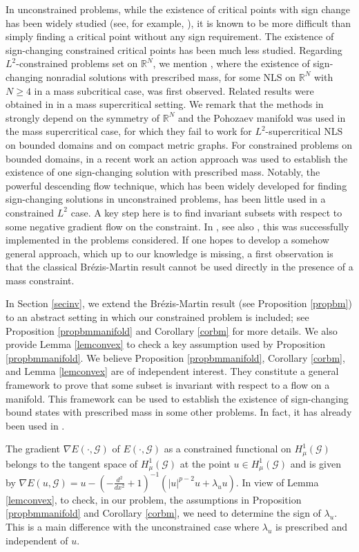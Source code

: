 \documentclass[10pt,a4paper]{article}
\theoremstyle{definition} \theoremstyle{remark}
\numberwithin{equation}{section}
\newcommand{\G}{\mathcal{G}}
\newcommand{\R}{\mathbb{R}}
\newcommand{\la}{\lambda}
\begin{document}
In unconstrained problems, while the existence of critical points with sign change has been widely studied (see, for example, \cite{BLW, LS, LWW, RTZ, SchZ1, SchZ, ZZ, Zou}), it is known to be more difficult than simply finding a critical point without any sign requirement. The existence of sign-changing constrained critical points has been much less studied. 
Regarding $L^2$-constrained problems set on $\R^N$, we mention \cite{JL1}, where the existence of sign-changing nonradial solutions with prescribed mass, for some NLS on $\R^N$ with $N \geq 4$ in a mass subcritical case, was first observed. Related results were obtained in \cite{JL2} in a mass supercritical setting.
We remark that the methods in \cite{JL1,JL2} strongly depend on the symmetry of $\R^N$ and the Pohozaev manifold was used in the mass supercritical case, for which they fail to work for $L^2$-supercritical NLS on bounded domains and on compact metric graphs. For constrained problems on bounded domains, in a recent work \cite{DeDoGaSe2} an action approach was used to establish the existence of one sign-changing solution with prescribed mass. 
Notably, the powerful descending flow technique, which has been widely developed for finding sign-changing solutions in unconstrained problems, has been little used in a constrained $L^2$ case. A key step here is to find invariant subsets with respect to some negative gradient flow on the constraint. In \cite{TaTe}, see also \cite{FeZhZhZh}, this was successfully implemented in the problems considered. If one hopes to develop a somehow general approach, which up to our knowledge is missing, a first observation is that the classical Br\'ezis-Martin result cannot be used directly in the presence of a mass constraint.

In Section \ref{secinv}, we extend the Br\'ezis-Martin result (see Proposition \ref{propbm}) to an abstract setting in which our constrained problem is included; see Proposition \ref{propbmmanifold} and Corollary \ref{corbm} for more details.
 We also provide Lemma \ref{lemconvex} to check a key assumption used by Proposition \ref{propbmmanifold}. We believe Proposition \ref{propbmmanifold}, Corollary \ref{corbm}, and Lemma \ref{lemconvex} are of independent interest. They constitute a general framework to prove that some subset is invariant with respect to a flow on a manifold. This framework can be used to establish the existence of sign-changing bound states with prescribed mass in some other problems. 
In fact, it has already been used in \cite{SZ}.

The gradient $\nabla E(\cdot, \G)$ of $E(\cdot,\G)$ as a constrained functional on $H^1_\mu(\G)$ belongs to the tangent space of $H^1_\mu(\G)$ at the point $u \in H^1_\mu(\G)$ and is given by
$\nabla E(u,\G) = u - (-\frac{d^2}{dx^2} +1)^{-1}(|u|^{p-2}u + \la_uu).$
In view of Lemma \ref{lemconvex}, to check, in our problem, the assumptions in Proposition \ref{propbmmanifold} and Corollary \ref{corbm}, we need to determine the sign of $\la_u$. This is a main difference with the unconstrained case where $\la_u$ is prescribed and independent of $u$.
\end{document}
